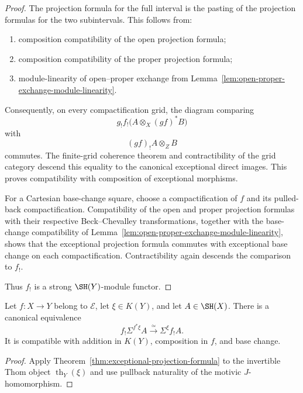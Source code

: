 \begin{proof}
The projection formula for the full interval is the pasting of the
projection formulas for the two subintervals.  This follows from:

\begin{enumerate}
    \item composition compatibility of the open projection formula;

    \item composition compatibility of the proper projection formula;

    \item module-linearity of open--proper exchange from
    Lemma~\ref{lem:open-proper-exchange-module-linearity}.
\end{enumerate}

Consequently, on every compactification grid, the diagram comparing
\[
    g_!f_!
    \bigl(
      A\otimes_X(gf)^*B
    \bigr)
\]
with
\[
    (gf)_!A\otimes_ZB
\]
commutes.  The finite-grid coherence theorem and contractibility of the
grid category descend this equality to the canonical exceptional direct
images.  This proves compatibility with composition of exceptional
morphisms.

For a Cartesian base-change square, choose a compactification of \(f\) and
its pulled-back compactification.  Compatibility of the open and proper
projection formulas with their respective Beck--Chevalley transformations,
together with the base-change compatibility of
Lemma~\ref{lem:open-proper-exchange-module-linearity},
shows that the exceptional projection formula commutes with exceptional
base change on each compactification.  Contractibility again descends the
comparison to \(f_!\).

Thus \(f_!\) is a strong \(\SH(Y)\)-module functor.
\end{proof}

\begin{corollary}
\label{cor:exceptional-target-thom-projection}
Let \(f:X\to Y\) belong to \(\mathcal E\), let \(\xi\in K(Y)\), and let
\(A\in\SH(X)\).  There is a canonical equivalence
\[
    f_!\Sigma^{f^*\xi}A
    \xrightarrow{\simeq}
    \Sigma^\xi f_!A.
\]
It is compatible with addition in \(K(Y)\), composition in \(f\), and
base change.
\end{corollary}

\begin{proof}
Apply Theorem~\ref{thm:exceptional-projection-formula} to the invertible
Thom object \(\operatorname{th}_Y(\xi)\) and use pullback naturality of the
motivic \(J\)-homomorphism.
\end{proof}

